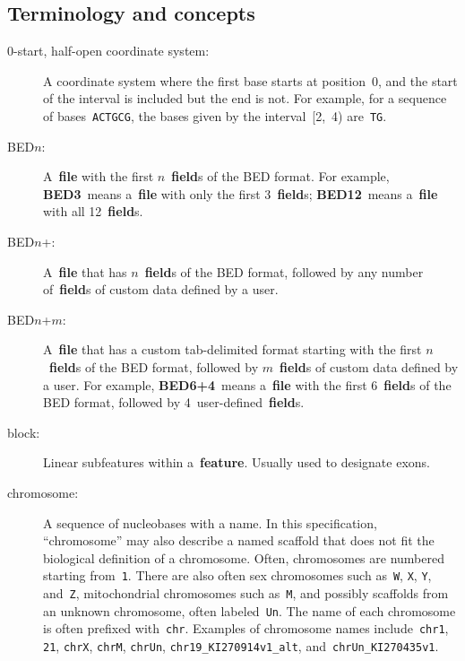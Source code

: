 \documentclass[11pt]{article}
\begin{document}
\subsection{Terminology and concepts}\label{sec:terms}
\begin{description}
\item[0-start, half-open coordinate system:]
  A coordinate system where the first base starts at position~0, and the start of the interval is included but the end is not.
  For example, for a sequence of bases~\texttt{ACTGCG}, the bases given by the interval~[2,~4) are~\texttt{TG}. %

\item[BED$n$:]
  A~\textbf{file} with the first $n$~\textbf{field}s of the \ac{BED} format.
  For example, \textbf{BED3}~means a~\textbf{file} with only the first 3~\textbf{field}s; \textbf{BED12}~means a~\textbf{file} with all 12~\textbf{field}s.

\item[BED$n$+:]
  A~\textbf{file} that has $n$~\textbf{field}s of the \ac{BED} format, followed by any number of~\textbf{field}s of custom data defined by a user.

\item[BED$n$+$m$:]
  A~\textbf{file} that has a custom tab-delimited format starting with the first $n$~\textbf{field}s of the \ac{BED} format, followed by $m$~\textbf{field}s of custom data defined by a user.
  For example, \textbf{BED6+4}~means a~\textbf{file} with the first 6~\textbf{field}s of the \ac{BED} format, followed by 4~user-defined~\textbf{field}s.

\item[block:]
  Linear subfeatures within a~\textbf{feature}.
  Usually used to designate exons.

\item[chromosome:]
  A sequence of nucleobases with a name.
  In this specification, ``chromosome'' may also describe a named scaffold that does not fit the biological definition of a chromosome.
  Often, chromosomes are numbered starting from~\texttt{1}.
  There are also often sex chromosomes such as~\texttt{W}, \texttt{X}, \texttt{Y}, and~\texttt{Z}, mitochondrial chromosomes such as~\texttt{M}, and possibly scaffolds from an unknown chromosome, often labeled~\texttt{Un}.
  The name of each chromosome is often prefixed with~\texttt{chr}.
  Examples of chromosome names include~\texttt{chr1}, \texttt{21}, \texttt{chrX}, \texttt{chrM}, \texttt{chrUn}, \texttt{chr19\_KI270914v1\_alt}, and~\texttt{chrUn\_KI270435v1}.


\end{description}
\end{document}
